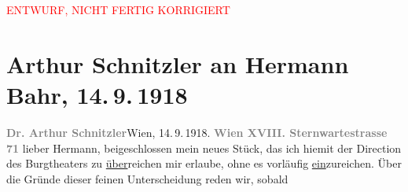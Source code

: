 
\begin{center}
            \textcolor{red}{ENTWURF, NICHT FERTIG KORRIGIERT}
                      \end{center}
            
         
         \newcommand{\erwaehntePersonen}{Personen: Leopold von Andrian-Werburg, Hermann Bahr, Clemens von Franckenstein, Robert Michel, Max von Millenkovich, Max Reinhardt}
         \newcommand{\erwaehnteInstitutionen}{Institutionen: Burgtheater, Königliche Hof- und Nationaltheater München}
         \newcommand{\erwaehnteOrte}{Orte: München, Partenkirchen, Sternwartestraße, Wien}
         \newcommand{\erwaehnteWerke}{Werke: Die Schwestern oder Casanova in Spa. Lustspiel in Versen}
               \section[Arthur Schnitzler an Hermann Bahr, 14. 9. 1918]{ Arthur Schnitzler an Hermann Bahr, 14. 9. 1918}\nopagebreak{}\rehead{ }\begin{ledgroupsized}[t]{13cm}\normalsize\beginnumbering \toendnotes[C]{\smallbreak\pagebreak[2]} 
\toendnotes[C]{\smallbreak}\pstart
           \textcolor{gray}{\textbf{{\pb}Dr. Arthur Schnitzler}}\hfill Wien, 14. 9. 1918.\pend
           \pstart
           \textcolor{gray}{\textbf{Wien XVIII. Sternwartestrasse 71}}\pend
           \pstart
           lieber Hermann, beigeschlossen mein neues Stück, das ich hiemit der Direction des Burgtheaters zu \uline{über}reichen mir erlaube, ohne es vorläufig \uline{ein}zureichen. Über die Gründe dieser feinen Unterscheidung reden wir, sobald

\end{ledgroupsized}
